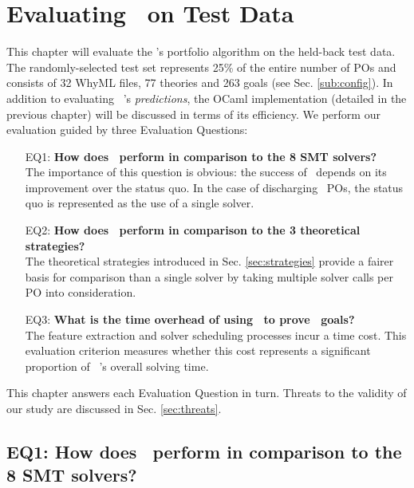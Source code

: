 \chapter{Evaluating \where~on Test Data}%
\thispagestyle{nohead}
\label{Evaluation} 

This chapter will evaluate the \where's portfolio algorithm on the held-back test data.
The randomly-selected test set represents 25\% of the entire number of POs and consists of 32 WhyML files, 77 theories and 263 goals  (see Sec. \ref{sub:config}).
In addition to evaluating \where~'s \textit{predictions}, the OCaml implementation (detailed in the previous chapter) will be discussed in terms of its efficiency.   
We perform our evaluation guided by three Evaluation Questions:
\begin{itemize}
	\item[EQ1:] \textbf{How does \where~perform in comparison to the 8 SMT solvers?}\\
	The importance of this question is obvious: the success of \where~depends on its improvement over the status quo. In the case of discharging \why~POs, the status quo is represented as the use of a single solver.
	\item[EQ2:] \textbf{How does \where~perform in comparison to the 3 theoretical strategies?}\\
	The theoretical strategies introduced in Sec. \ref{sec:strategies} provide a fairer basis for comparison than a single solver by taking multiple solver calls per PO into consideration.
	\item[EQ3:] \textbf{What is the time overhead of using \where~to prove \why~goals?}\\
	The feature extraction and solver scheduling processes incur a time cost. This evaluation criterion measures whether this cost represents a significant proportion of \where~'s overall solving time.    	
\end{itemize}
This chapter answers each Evaluation Question in turn.
Threats to the validity of our study are discussed in Sec. \ref{sec:threats}. 

\section{EQ1: How does \where~perform in comparison to the 8 SMT solvers?}


